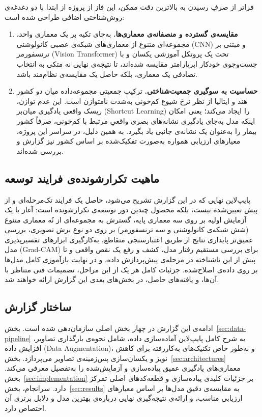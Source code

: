 فراتر از صرفِ رسیدن به بالاترین دقت ممکن، این فاز از پروژه از ابتدا با دو دغدغه‌ی روش‌شناختی اضافی طراحی شده است:

\begin{enumerate}[rightmargin=0.5cm]
    \item \textbf{مقایسه‌ی گسترده و منصفانه‌ی معماری‌ها.} به‌جای تکیه بر یک معماری واحد، مجموعه‌ای متنوع از معماری‌های شبکه‌ی عصبی کانولوشنی (CNN) و مبتنی بر ترنسفورمر (Vision Transformer) تحت یک پروتکل آموزشی یکسان و با جست‌وجوی خودکار ابرپارامتر مقایسه شده‌اند، تا نتیجه‌ی نهایی نه متکی به انتخاب تصادفی یک معماری، بلکه حاصل یک مقایسه‌ی نظام‌مند باشد.
    \item \textbf{حساسیت به سوگیری جمعیت‌شناختی.} ترکیب جمعیتی مجموعه‌داده میان دو کشور هند و ایتالیا از نظر نرخ شیوع کم‌خونی به‌شدت نامتوازن است. این عدم توازن، ریسک واقعی یادگیری میان‌بر (Shortcut Learning) را ایجاد می‌کند؛ یعنی امکان اینکه مدل به‌جای یادگیری نشانه‌های بصری واقعیِ مرتبط با کم‌خونی، صرفاً کشور بیمار را به‌عنوان یک نشانه‌ی جانبی یاد بگیرد. به همین دلیل، در سراسر این پروژه، معیارهای ارزیابی همواره به‌صورت تفکیک‌شده بر اساس کشور نیز گزارش و بررسی شده‌اند.
\end{enumerate}

\subsection{ماهیت تکرارشونده‌ی فرایند توسعه}
\label{subsec:iterative-nature}

پایپ‌لاین نهایی که در این گزارش تشریح می‌شود، حاصل یک فرایند تک‌مرحله‌ای و از پیش تعیین‌شده نیست، بلکه محصول چندین دور توسعه‌ی تکرارشونده است: آغاز با یک آزمایش اولیه بر روی سه معماری پایه، گسترش به مجموعه‌ای از نُه معماری متنوع (شش شبکه‌ی کانولوشنی و سه ترنسفورمر) بر روی دو نوع برش تصویری، بررسی عمیق‌تر پایداری نتایج از طریق اعتبارسنجی متقاطع، به‌کارگیری ابزارهای تفسیرپذیری مدل (Grad-CAM) برای بررسی مستقیم رفتار مدل، کشف و رفع یک نقص واقعی و تا پیش از این ناشناخته در مرحله‌ی پیش‌پردازش داده، و در نهایت بازآموزی کامل مدل‌ها بر روی داده‌ی اصلاح‌شده. جزئیات کامل هر یک از این مراحل، تصمیمات فنی متناظر با آن‌ها، و یافته‌های حاصل، در بخش‌های بعدی این گزارش ارائه خواهند شد.

\subsection{ساختار گزارش}
\label{subsec:report-structure}

ادامه‌ی این گزارش در چهار بخش اصلی سازمان‌دهی شده است. بخش~\ref{sec:data-pipeline} به شرح کامل پایپ‌لاین آماده‌سازی داده، شامل نحوه‌ی بارگذاری تصاویر، افزایش داده (Data Augmentation)، و به‌طور خاص تکنیک‌های به‌کاررفته برای کاهش نویز و یکسان‌سازی پس‌زمینه‌ی تصاویر می‌پردازد. بخش~\ref{sec:architectures} معماری‌های یادگیری عمیق پیاده‌سازی و آزمایش‌شده را به‌تفصیل معرفی می‌کند. بخش~\ref{sec:implementation} بر جزئیات کلیدی پیاده‌سازی و قطعه‌کدهای اصلی  تمرکز دارد. سرانجام، بخش~\ref{sec:results} به مقایسه‌ی دقیق مدل‌ها بر اساس معیارهای ارزیابی مناسب، و ارائه‌ی نتیجه‌گیری نهایی درباره‌ی بهترین مدل و دلایل برتری آن اختصاص دارد.
